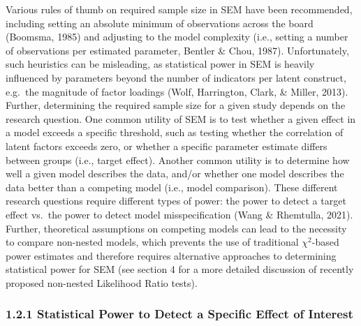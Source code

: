 \documentclass[
  man,floatsintext]{apa6}
\begin{document}
Various rules of thumb on required sample size in SEM have been recommended, including setting an absolute minimum of observations across the board (Boomsma, 1985) and adjusting to the model complexity (i.e., setting a number of observations per estimated parameter, Bentler \& Chou, 1987). Unfortunately, such heuristics can be misleading, as statistical power in SEM is heavily influenced by parameters beyond the number of indicators per latent construct, e.g.~the magnitude of factor loadings (Wolf, Harrington, Clark, \& Miller, 2013). Further, determining the required sample size for a given study depends on the research question. One common utility of SEM is to test whether a given effect in a model exceeds a specific threshold, such as testing whether the correlation of latent factors exceeds zero, or whether a specific parameter estimate differs between groups (i.e., target effect). Another common utility is to determine how well a given model describes the data, and/or whether one model describes the data better than a competing model (i.e., model comparison). These different research questions require different types of power: the power to detect a target effect vs.~the power to detect model misspecification (Wang \& Rhemtulla, 2021). Further, theoretical assumptions on competing models can lead to the necessity to compare non-nested models, which prevents the use of traditional \(\chi^2\)-based power estimates and therefore requires alternative approaches to determining statistical power for SEM (see section 4 for a more detailed discussion of recently proposed non-nested Likelihood Ratio tests).

\hypertarget{statistical-power-to-detect-a-specific-effect-of-interest}{%
\subsubsection{1.2.1 Statistical Power to Detect a Specific Effect of Interest}\label{statistical-power-to-detect-a-specific-effect-of-interest}}
\end{document}
